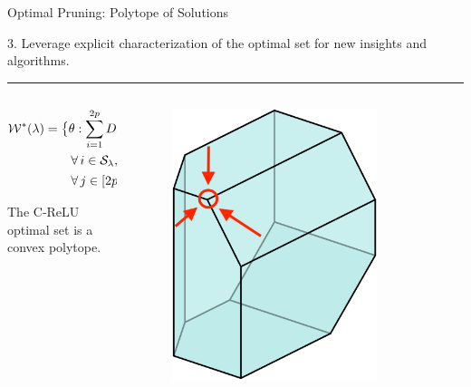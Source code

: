 \documentclass[usenames,dvipsnames,mathserif,notheorems]{beamer}
\newcommand{\horizontalrule}{
	{
			\vspace{-0.5em}
			\center \rule{\textwidth}{0.1em}
			\vspace{-0.2em}
		}
}
\newcommand{\good}[1]{\textcolor{good}{#1}}
\begin{document}
\begin{frame}{Optimal Pruning: Polytope of Solutions}

	{\raggedright
		\large
		3. Leverage explicit characterization of the optimal
		set for \good{new insights and algorithms}.
		\pause
	}

	\horizontalrule

	\begin{columns}
		\begin{column}{0.5\textwidth}

			\begin{equation*}
				\begin{aligned}
					 & \mathcal{W}^*(\lambda) =
					\big\{ \theta  : \sum_{i=1}^{2p} D_i X \theta_i = \hat y,      \\
					 & \hspace{5em} \forall \, {i}  \in  \mathcal{S}_\lambda,
					\theta_i =  \alpha_{i} q_i, \alpha_{i} \geq 0, \,              \\
					 & \hspace{5em} \forall \, j \in [2p] \setminus \mathcal{S}_\lambda,
					\theta_{j} = 0
					\big\}
				\end{aligned}
			\end{equation*}

			\pause
			The C-ReLU optimal set is a \good{convex polytope}.

		\end{column}
		\begin{column}{0.5\textwidth}
			\pause
			\begin{figure}[c]
				\centering
				\includegraphics[width=0.8\textwidth]{assets/polytope.png}
				\caption{}
				\label{fig:}
			\end{figure}
		\end{column}
	\end{columns}

\end{frame}
\end{document}

